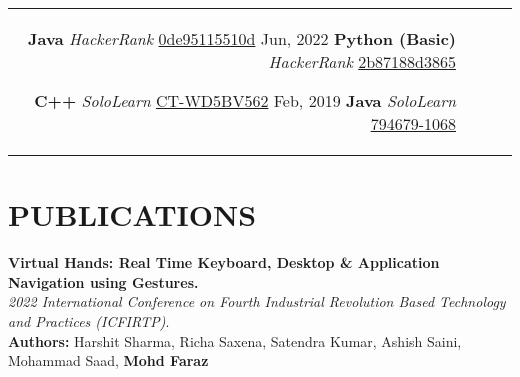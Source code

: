 \documentclass[
	10pt, %
	]{FreemanCV}
\begin{document}
\begin{paracol}{2}

\begin{supertabular}{r l r l} %

						{\textbf{Java}}
						{\textit{HackerRank}}
						{\raisebox{-1pt}{\faExternalLink} \href{https://www.hackerrank.com/certificates/0de95115510d}{0de95115510d}}
				  {Jun, 2022}
				  		{\textbf{Python (Basic)}}
						{\textit{HackerRank}}
						{\raisebox{-1pt}{\faExternalLink} \href{https://www.hackerrank.com/certificates/2b87188d3865}{2b87188d3865}}
	
						{\textbf{C++}}
						{\textit{SoloLearn}}
						{\raisebox{-1pt}{\faExternalLink} \href{https://www.sololearn.com/Certificate/CT-WD5BV562/png}{CT-WD5BV562}}
					{Feb, 2019}
						{\textbf{Java}}
						{\textit{SoloLearn}}
						{\raisebox{-1pt}{\faExternalLink} \href{https://www.sololearn.com/certificates/course/en/794679/1068/landscape/png}{794679-1068}}
	
	
\end{supertabular}


\section{PUBLICATIONS}


\textbf{Virtual Hands: Real Time Keyboard, Desktop \& Application Navigation using Gestures.}\\\textit{2022 International Conference on Fourth Industrial Revolution Based Technology and Practices (ICFIRTP)}.\\\textbf{Authors:} Harshit Sharma, Richa Saxena, Satendra Kumar, Ashish Saini, Mohammad Saad, \textbf{Mohd Faraz}

\medskip %




\end{paracol}
\end{document}
